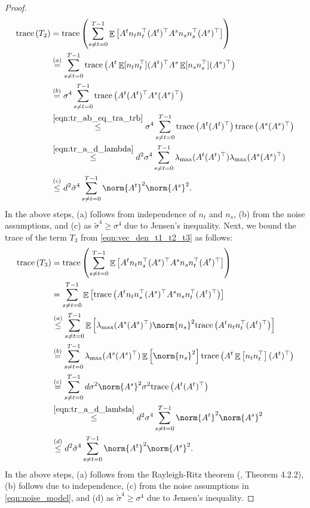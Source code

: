 \documentclass[letterpaper, 11 pt]{article}
\newcommand{\tr}[1]{\text{trace}\left( #1 \right)}
\DeclareMathOperator{\E}{\mathbb{E}}
\begin{document}
\begin{proof}
\begin{align}
    \tr{T_2} &= \tr{\sum_{s\neq t=0}^{T-1} \E\left[ A^tn_tn_t^{\top}(A^t)^{\top} A^sn_sn_s^{\top}(A^s)^{\top}\right]} \nonumber\\
    &\overset{(a)}{=} \sum_{s\neq t=0}^{T-1} \tr{A^t\E[n_tn_t^{\top}](A^t)^{\top} A^s\E[n_sn_s^{\top}](A^s)^{\top}} \nonumber\\
    &\overset{(b)}{=} \sigma^4 \sum_{s\neq t=0}^{T-1}  \tr{A^t(A^t)^{\top} A^s(A^s)^{\top}} \nonumber\\
    &\overset{\eqref{eqn:tr_ab_eq_tra_trb}}{\leq} \sigma^4 \sum_{s\neq t=0}^{T-1} \tr{A^t(A^t)^{\top}} \tr{A^s(A^s)^{\top}} \nonumber\\
    &\overset{\eqref{eqn:tr_a_d_lambda}}{\leq} d^2 \sigma^4 \sum_{s\neq t=0}^{T-1} \lambda_{\max}(A^t(A^t)^{\top}) \lambda_{\max}(A^s(A^s)^{\top}) \nonumber\\
    & \overset{(c)}{\leq} d^2 \tilde{\sigma}^4 \sum_{s\neq t=0}^{T-1} \norm{A^t}^2 \norm{A^s}^2. \label{eqn:t2bound}
\end{align}
In the above steps, (a) follows from independence of $n_t$ and $n_s$, (b) from the noise assumptions, and (c) as $\tilde{\sigma}^4 \geq \sigma^4$ due to Jensen's inequality. Next, we bound the trace of the term $T_3$ from \eqref{eqn:vec_den_t1_t2_t3} as follows:
\begin{align}
    \tr{T_3} &= \tr{\sum_{s\neq t=0}^{T-1} \E\left[ A^tn_tn_s^{\top}(A^s)^{\top} A^sn_sn_t^{\top}(A^t)^{\top}\right]} \nonumber \\
    &= \sum_{s\neq t=0}^{T-1} \E\left[\tr{A^tn_tn_s^{\top}(A^s)^{\top} A^sn_sn_t^{\top}(A^t)^{\top}}\right] \nonumber\\
    &\overset{(a)}{\leq} \sum_{s\neq t=0}^{T-1} \E\left[\lambda_{\max}(A^s(A^s)^{\top})\norm{n_s}^2\tr{A^tn_tn_t^{\top}(A^t)^{\top}}\right] \nonumber\\
    & \overset{(b)}{=} \sum_{s\neq t=0}^{T-1} \lambda_{\max}(A^s(A^s)^{\top})\E\left[\norm{n_s}^2\right]\tr{A^t\E\left[n_tn_t^{\top}\right](A^t)^{\top}} \nonumber\\
    &\overset{(c)}{=} \sum_{s\neq t=0}^{T-1} d \sigma^2 \norm{A^s}^2 \sigma^2 \tr{A^t(A^t)^{\top}} \nonumber\\
    &\overset{\eqref{eqn:tr_a_d_lambda}}{\leq} d^2  \sigma^4 \sum_{s\neq t=0}^{T-1} \norm{A^t}^2 \norm{A^s}^2 \nonumber \\
    &\overset{(d)}{\leq} d^2  \tilde{\sigma}^4 \sum_{s\neq t=0}^{T-1} \norm{A^t}^2 \norm{A^s}^2. \label{eqn:t3bound} 
\end{align}
In the above steps, (a) follows from the Rayleigh-Ritz theorem (\cite{horn2012matrix}, Theorem 4.2.2), (b) follows due to independence, (c) from the noise assumptions in \eqref{eqn:noise_model}, and (d) as $\tilde{\sigma}^4 \geq \sigma^4$ due to Jensen's inequality.


\end{proof}
\end{document}
